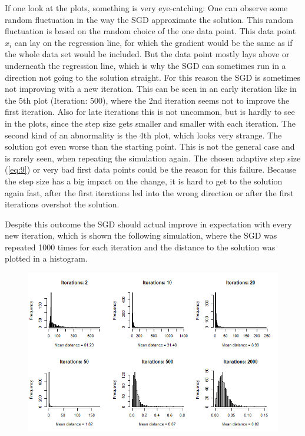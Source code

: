 \documentclass{article}
\begin{document}
If one look at the plots, something is very eye-catching: One can observe some random fluctuation in the way the SGD approximate the solution. This random fluctuation is based on the random choice of the one data point. This data point $x_i$ can lay on the regression line, for which the gradient would be the same as if the whole data set would be included. But the data point mostly lays above or underneath the regression line, which is why the SGD can sometimes run in a direction not going to the solution straight. For this reason the SGD is sometimes not improving with a new iteration. This can be seen in an early iteration like in the 5th plot (Iteration: 500), where the 2nd iteration seems not to improve the first iteration. Also for late iterations this is not uncommon, but is hardly to see in the plots, since the step size gets smaller and smaller with each iteration. The second kind of an abnormality is the 4th plot, which looks very strange. The solution got even worse than the starting point. This is not the general case and is rarely seen, when repeating the simulation again. The chosen adaptive step size (\ref{eq:9}) or very bad first data points could be the reason for this failure. Because the step size has a big impact on the change, it is hard to get to the solution again fast, after the first iterations led into the wrong direction or after the first iterations overshot the solution. 

Despite this outcome the SGD should actual improve in expectation with every new iteration, which is shown the following simulation, where the SGD was repeated 1000 times for each iteration and the distance to the solution was plotted in a histogram.

\begin{figure}[h]
    \centering
    \includegraphics[width=\textwidth]{Simulation(diffIterations)2.png}
    \label{fig:mesh2}
\end{figure}
\end{document}
